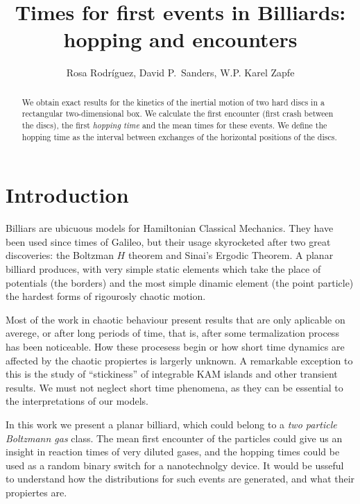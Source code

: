 \documentclass[letterpaper,12pt]{amsart}
\begin{document}
\title{Times for first events in Billiards: hopping and encounters}
\author{Rosa Rodríguez,  David P.~Sanders, W.P. Karel Zapfe}
\address{Departamento de Física, Facultad de Ciencias, 
Universidad Nacional Autónoma de México, Ciudad Universitaria, 
Del.~Coyoacán, México D.F. 04510, Mexico}

\maketitle
\begin{abstract}
  We obtain exact results for the kinetics of the inertial motion of 
two hard discs in a rectangular two-dimensional box.
We calculate the first encounter (first crash between the discs),
the first \emph{hopping time} and the mean times for these events.
  We define the  hopping time as the interval 
 between exchanges of the horizontal positions of the discs.
\end{abstract}


\section{Introduction}

Billiars are ubicuous models for
Hamiltonian Classical Mechanics. They have been used since times
of Galileo, but their usage skyrocketed after two great
discoveries: the Boltzman $\mathit{H}$ theorem and Sinai's Ergodic
Theorem.  A planar billiard produces, with very simple static elements
which take the place of potentials (the borders) and the most simple
dinamic element (the point particle) the hardest 
forms of rigourosly chaotic motion. 

Most of the work in chaotic behaviour present results that
are only aplicable on averege, or after long periods of time, that is,
after some termalization process has been noticeable. 
How these procesess begin
or how short time dynamics are affected by the chaotic propiertes
is largerly unknown. A remarkable exception to this
is the study of ``stickiness'' \cite{Altman} 
of integrable KAM islands and other
transient results. 
We must not neglect short time phenomena, as they can be essential
to the interpretations of our models. 

In this work we present a planar billiard, which could belong
to a \emph{two particle Boltzmann gas} class. The mean first
encounter of the particles could give us an insight in
reaction times of very diluted gases, and the hopping times
could be used as a random binary switch for a nanotechnolgy device.
It would be usseful to understand how the distributions for
such events are generated, and what their propiertes are.
\end{document}

